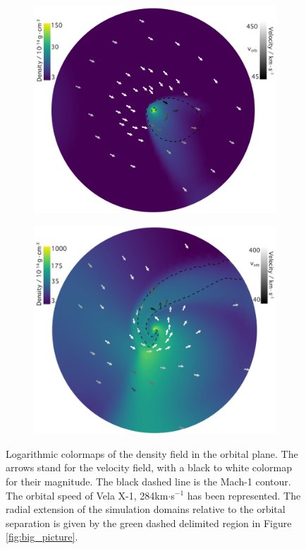 \documentclass{aa}
\begin{document}
\begin{figure}
\begin{subfigure}{.5\textwidth}
\centering
\includegraphics[width=0.99\columnwidth]{Pictures/LF_adiab.jpeg}
  \label{fig:sfig1}
\end{subfigure}
\begin{subfigure}{.5\textwidth}
\centering
\includegraphics[width=0.99\columnwidth]{Pictures/HS_adiab.jpeg}
  \label{fig:sfig2}
\end{subfigure}
\caption{Logarithmic colormaps of the density field in the orbital plane. The arrows stand for the velocity field, with a black to white colormap for their magnitude. The black dashed line is the Mach-1 contour. The orbital speed of Vela X-1, 284km$\cdot$s$^{-1}$ has been represented. The radial extension of the simulation domains relative to the orbital separation is given by the green dashed delimited region in Figure\,\ref{fig:big_picture}.}
\label{fig:adiab}
\end{figure} 
\end{document}
